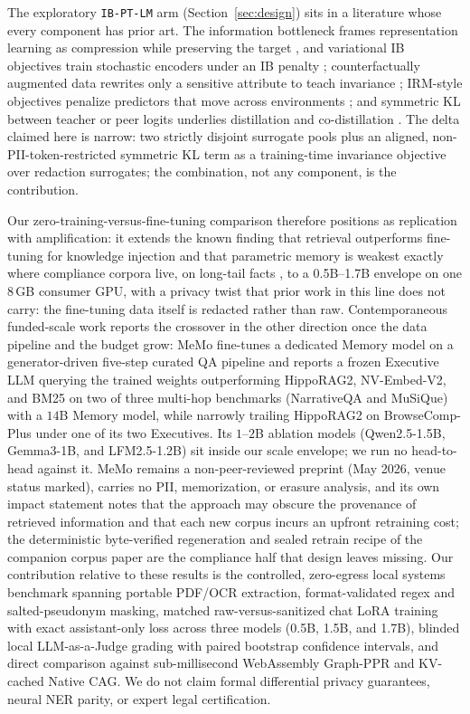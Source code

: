 \documentclass{article}
\begin{document}
The exploratory \texttt{IB-PT-LM} arm (Section~\ref{sec:design}) sits in a literature whose every component has prior art. The information bottleneck frames representation learning as compression while preserving the target \citep{tishby2015ib}, and variational IB objectives train stochastic encoders under an IB penalty \citep{alemi2017vib}; counterfactually augmented data rewrites only a sensitive attribute to teach invariance \citep{kaushik2020counterfactual}; IRM-style objectives penalize predictors that move across environments \citep{arjovsky2019irm}; and symmetric KL between teacher or peer logits underlies distillation and co-distillation \citep{hinton2015distilling,anil2018online}. The delta claimed here is narrow: two strictly disjoint surrogate pools plus an aligned, non-PII-token-restricted symmetric KL term as a training-time invariance objective over redaction surrogates; the combination, not any component, is the contribution.

Our zero-training-versus-fine-tuning comparison therefore positions as replication with amplification: it extends the known finding that retrieval outperforms fine-tuning for knowledge injection \citep{ovadia2023finetuning} and that parametric memory is weakest exactly where compliance corpora live, on long-tail facts \citep{mallen2023when,kandpal2023longtail}, to a 0.5B--1.7B envelope on one 8\,GB consumer GPU, with a privacy twist that prior work in this line does not carry: the fine-tuning data itself is redacted rather than raw. Contemporaneous funded-scale work reports the crossover in the other direction once the data pipeline and the budget grow: MeMo \citep{quek2026memo} fine-tunes a dedicated Memory model on a generator-driven five-step curated QA pipeline and reports a frozen Executive LLM querying the trained weights outperforming HippoRAG2, NV-Embed-V2, and BM25 on two of three multi-hop benchmarks (NarrativeQA and MuSiQue) with a $14$B Memory model, while narrowly trailing HippoRAG2 on BrowseComp-Plus under one of its two Executives. Its $1$--$2$B ablation models (Qwen2.5-1.5B, Gemma3-1B, and LFM2.5-1.2B) sit inside our scale envelope; we run no head-to-head against it. MeMo remains a non-peer-reviewed preprint (May 2026, venue status marked), carries no PII, memorization, or erasure analysis, and its own impact statement notes that the approach may obscure the provenance of retrieved information and that each new corpus incurs an upfront retraining cost; the deterministic byte-verified regeneration and sealed retrain recipe of the companion corpus paper \citep{ardiyansyah2026graphcorpus} are the compliance half that design leaves missing. Our contribution relative to these results is the controlled, zero-egress local systems benchmark spanning portable PDF/OCR extraction, format-validated regex and salted-pseudonym masking, matched raw-versus-sanitized chat LoRA training with exact assistant-only loss across three models (0.5B, 1.5B, and 1.7B), blinded local LLM-as-a-Judge grading with paired bootstrap confidence intervals, and direct comparison against sub-millisecond WebAssembly Graph-PPR and KV-cached Native CAG. We do not claim formal differential privacy guarantees, neural NER parity, or expert legal certification.
\end{document}
